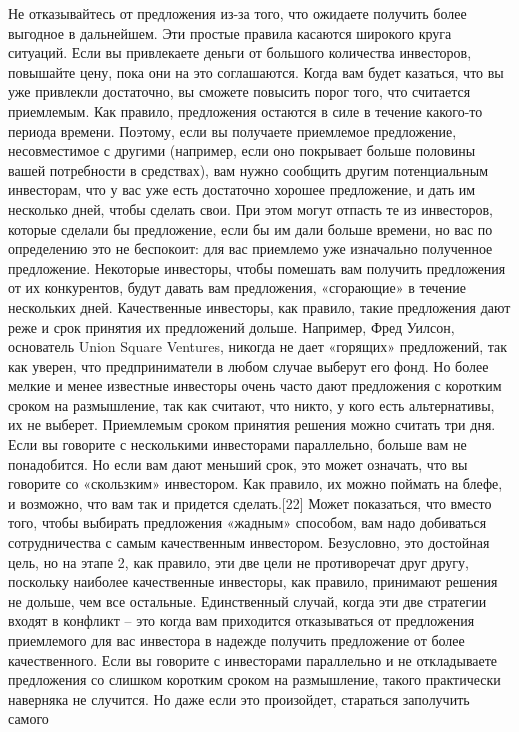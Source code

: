 \documentclass[ebook,12pt,oneside,openany]{memoir}
\begin{document}
Не отказывайтесь от предложения из-за того, что ожидаете получить
более выгодное в дальнейшем. Эти простые правила касаются широкого
круга ситуаций. Если вы привлекаете деньги от большого количества
инвесторов, повышайте цену, пока они на это соглашаются. Когда вам
будет казаться, что вы уже привлекли достаточно, вы сможете повысить
порог того, что считается приемлемым. Как правило, предложения
остаются в силе в течение какого-то периода времени. Поэтому, если вы
получаете приемлемое предложение, несовместимое с другими (например,
если оно покрывает больше половины вашей потребности в средствах), вам
нужно сообщить другим потенциальным инвесторам, что у вас уже есть
достаточно хорошее предложение, и дать им несколько дней, чтобы
сделать свои. При этом могут отпасть те из инвесторов, которые сделали
бы предложение, если бы им дали больше времени, но вас по определению
это не беспокоит: для вас приемлемо уже изначально полученное
предложение. Некоторые инвесторы, чтобы помешать вам получить
предложения от их конкурентов, будут давать вам предложения,
«сгорающие» в течение нескольких дней. Качественные инвесторы, как
правило, такие предложения дают реже и срок принятия их предложений
дольше. Например, Фред Уилсон, основатель Union Square Ventures,
никогда не дает «горящих» предложений, так как уверен, что
предприниматели в любом случае выберут его фонд. Но более мелкие и
менее известные инвесторы очень часто дают предложения с коротким
сроком на размышление, так как считают, что никто, у кого есть
альтернативы, их не выберет. Приемлемым сроком принятия решения можно
считать три дня. Если вы говорите с несколькими инвесторами
параллельно, больше вам не понадобится. Но если вам дают меньший срок,
это может означать, что вы говорите со «скользким» инвестором. Как
правило, их можно поймать на блефе, и возможно, что вам так и придется
сделать.[22] Может показаться, что вместо того, чтобы выбирать
предложения «жадным» способом, вам надо добиваться сотрудничества с
самым качественным инвестором. Безусловно, это достойная цель, но на
этапе 2, как правило, эти две цели не противоречат друг другу,
поскольку наиболее качественные инвесторы, как правило, принимают
решения не дольше, чем все остальные. Единственный случай, когда эти
две стратегии входят в конфликт – это когда вам приходится
отказываться от предложения приемлемого для вас инвестора в надежде
получить предложение от более качественного. Если вы говорите с
инвесторами параллельно и не откладываете предложения со слишком
коротким сроком на размышление, такого практически наверняка не
случится. Но даже если это произойдет, стараться заполучить самого
\end{document}
